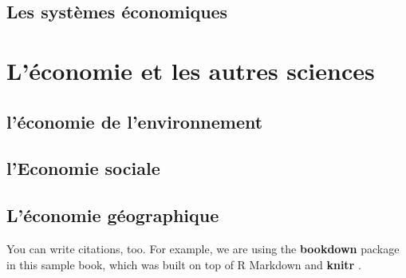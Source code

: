 \documentclass[
]{book}
\begin{document}
\hypertarget{les-systuxe8mes-uxe9conomiques}{%
\section{Les systèmes économiques}\label{les-systuxe8mes-uxe9conomiques}}

\hypertarget{luxe9conomie-et-les-autres-sciences}{%
\chapter{L'économie et les autres sciences}\label{luxe9conomie-et-les-autres-sciences}}

\hypertarget{luxe9conomie-de-lenvironnement}{%
\section{l'économie de l'environnement}\label{luxe9conomie-de-lenvironnement}}

\hypertarget{leconomie-sociale}{%
\section{l'Economie sociale}\label{leconomie-sociale}}

\hypertarget{luxe9conomie-guxe9ographique}{%
\section{L'économie géographique}\label{luxe9conomie-guxe9ographique}}

You can write citations, too. For example, we are using the \textbf{bookdown} package \citep{CompuAct2014} in this sample book, which was built on top of R Markdown and \textbf{knitr} \citep{CompuAct2014}.

  
\end{document}
